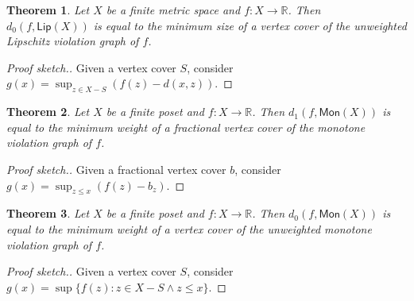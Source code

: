 \documentclass[11pt,a4paper]{article}
\newtheorem{theorem}{Theorem}
\newcommand*{\R}[0]{\mathbb{R}}
\newcommand*{\Lip}[0]{\mathsf{Lip}}
\newcommand*{\Mon}[0]{\mathsf{Mon}}
\begin{document}
\begin{theorem}
  Let $X$ be a finite metric space and $f : X \to \R$.
  Then $d_0(f, \Lip(X))$ is equal to the minimum size of
  a vertex cover of the unweighted Lipschitz violation graph of $f$.
\end{theorem}
\begin{proof}[Proof sketch.]
  Given a vertex cover $S$,
  consider $g(x) = \sup_{z \in X - S}(f(z) - d(x, z))$.
\end{proof}

\begin{theorem}
  Let $X$ be a finite poset and $f : X \to \R$.
  Then $d_1(f, \Mon(X))$ is equal to the minimum weight of
  a fractional vertex cover of the monotone violation graph of $f$.
\end{theorem}
\begin{proof}[Proof sketch.]
  Given a fractional vertex cover $b$,
  consider $g(x) = \sup_{z \le x} (f(z) - b_z)$.
\end{proof}

\begin{theorem}
  Let $X$ be a finite poset and $f : X \to \R$.
  Then $d_0(f, \Mon(X))$ is equal to the minimum weight of
  a vertex cover of the unweighted monotone violation graph of $f$.
\end{theorem}
\begin{proof}[Proof sketch.]
  Given a vertex cover $S$,
  consider $g(x) = \sup\{f(z) : z \in X - S \land z \le x\}$.
\end{proof}
\end{document}
